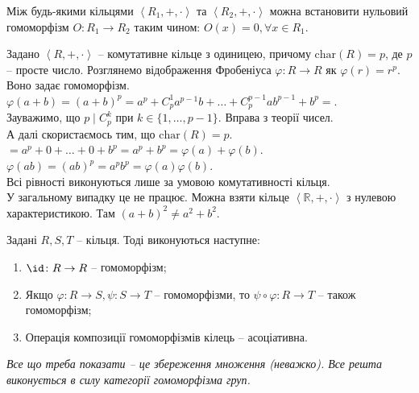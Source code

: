 \documentclass{math_library}
\begin{document}
\begin{example}
Між будь-якими кільцями $\left<R_1,+,\cdot\right>$ та $\left<R_2,+,\cdot \right>$ можна встановити нульовий гомоморфізм $O \colon R_1 \to R_2$ таким чином: $O(x) = 0, \forall x \in R_1$.

\end{example}

\begin{example}
Задано $\left< R,+,\cdot\right>$ -- комутативне кільце з одиницею, причому $\text{char}(R) = p$, де $p$ -- просте число. Розглянемо відображення Фробеніуса $\varphi \colon R \to R$ як $\varphi(r) = r^p$. Воно задає гомоморфізм.\\
$\varphi(a+b) = (a+b)^p = a^p + C_p^1 a^{p-1}b + \dots + C_p^{p-1} ab^{p-1} + b^p \boxed{=}$.\\
Зауважимо, що $p \mid C_p^k$ при $k \in \{1,\dots,p-1\}$. Вправа з теорії чисел.\\
А далі скористаємось тим, що $\text{char}(R) = p$.\\
$\boxed{=} a^p + 0 + \dots + 0 + b^p = a^p + b^p = \varphi(a) + \varphi(b)$.\\
$\varphi(ab) = (ab)^p = a^p b^p = \varphi(a) \varphi(b)$.\\
Всі рівності виконуються лише за умовою комутативності кільця.
\bigskip \\
У загальному випадку це не працює. Можна взяти кільце $\left< \mathbb{R},+,\cdot \right>$ з нулевою характеристикою. Там $(a+b)^2 \neq a^2+b^2$.
\end{example}

\begin{proposition}
Задані $R,S,T$ -- кільця. Тоді виконуються наступне:
\begin{enumerate}[nosep,wide=0pt,label={\arabic*)}]
\item $\id \colon R \to R$ -- гомоморфізм;
\item Якщо $\varphi \colon R \! \to S, \psi \colon S \! \to T$ -- гомоморфізми, то $\psi \circ \varphi \colon R \! \to T$ -- також гомоморфізм;
\item Операція композиції гомоморфізмів кілець -- асоціативна.
\end{enumerate}
\textit{Все що треба показати -- це збереження множення (неважко). Все решта виконується в силу категорії гомоморфізма груп.}
\end{proposition}
\end{document}
